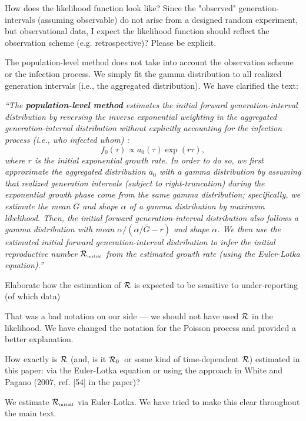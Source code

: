 \documentclass[12pt]{article}
\newcommand{\RR}{\ensuremath{{\cal R}}}
\newcommand{\Rx}[1]{\ensuremath{{\cal R}_{#1}}}
\newcommand{\Ro}{\Rx{0}}
\newcommand{\Rini}{\Rx{\textrm{\tiny initial}}}
\newcommand{\revtext}{\textsf}
\newcommand{\newtext}[1]{\textsl{``#1''}}
\begin{document}
\revtext{How does the likelihood
function look like? Since the "observed" generation-intervals (assuming
observable) do not arise from a designed random experiment, but observational data, I expect the likelihood function should reflect the observation
scheme (e.g. retrospective)? Please be explicit.
}

The population-level method does not take into account the observation scheme or the infection process. 
We simply fit the gamma distribution to all realized generation intervals (i.e., the aggregated distribution).
We have clarified the text: 

\newtext{The \textbf{population-level method} estimates the initial forward generation-interval distribution by reversing the inverse exponential weighting in the aggregated generation-interval distribution without explicitly accounting for the infection process (i.e., who infected whom) \citep{tomba2010some, nishiura2010time, britton2019estimation}:
\begin{equation}
f_0(\tau) \propto a_0(\tau) \exp(r\tau),
\end{equation}
where $r$ is the initial exponential growth rate.
In order to do so, we first approximate the aggregated distribution $a_0$ with a gamma distribution by assuming that realized generation intervals (subject to right-truncation) during the exponential growth phase come from the same gamma distribution;
specifically, we estimate the mean $\bar G$ and shape $\alpha$ of a gamma distribution by maximum likelihood.
Then, the initial forward generation-interval distribution also follows a gamma distribution with mean $\alpha/(\alpha/\bar G - r)$ and shape $\alpha$.
We then use the estimated initial forward generation-interval distribution to infer the initial reproductive number $\Rini$ from the estimated growth rate (using the Euler-Lotka equation).}

\revtext{
Elaborate how the estimation of $\RR$ is expected to be sensitive to under-reporting (of which data)
}

That was a bad notation on our side --- we should not have used $\RR$ in the likelihood. 
We have changed the notation for the Poisson process and provided a better explanation.

\revtext{
How exactly is $\RR$ (and, is it \Ro\ or some kind of time-dependent \RR) estimated in this paper: via the Euler-Lotka equation or using the approach in White and Pagano (2007, ref. [54] in the paper)?
}

We estimate $\Rini$ via Euler-Lotka. We have tried to make this clear throughout the main text.
\end{document}
